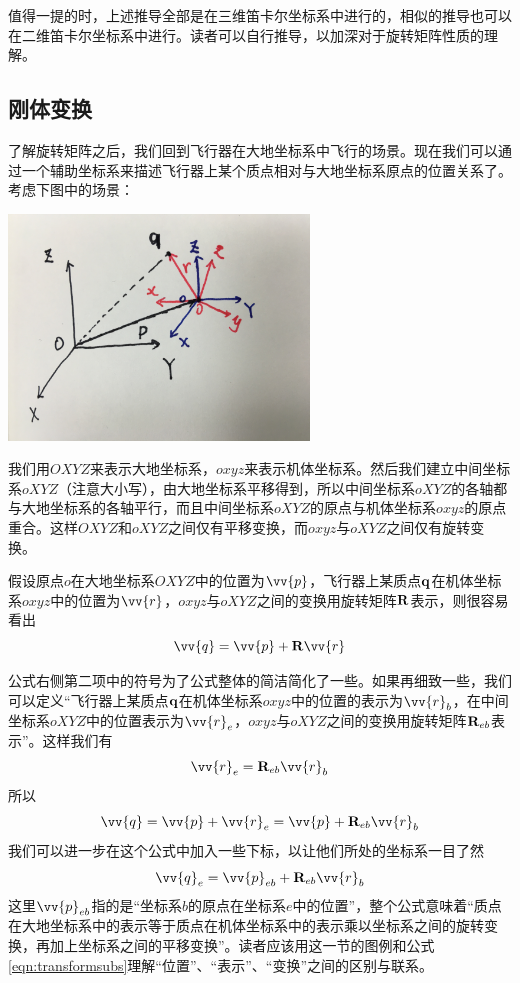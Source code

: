 \documentclass[11pt]{article}
\begin{document}
值得一提的时，上述推导全部是在三维笛卡尔坐标系中进行的，相似的推导也可以在二维笛卡尔坐标系中进行。读者可以自行推导，以加深对于旋转矩阵性质的理解。

\subsection{刚体变换}\label{sec:transform}
了解旋转矩阵之后，我们回到飞行器在大地坐标系中飞行的场景。现在我们可以通过一个辅助坐标系来描述飞行器上某个质点相对与大地坐标系原点的位置关系了。考虑下图中的场景：

\begin{center}
\includegraphics[width=0.6\textwidth]{images/IMG_2297.jpg}
\end{center}

我们用$OXYZ$来表示大地坐标系，$oxyz$来表示机体坐标系。然后我们建立中间坐标系$oXYZ$（注意大小写），由大地坐标系平移得到，所以中间坐标系$oXYZ$的各轴都与大地坐标系的各轴平行，而且中间坐标系$oXYZ$的原点与机体坐标系$oxyz$的原点重合。这样$OXYZ$和$oXYZ$之间仅有平移变换，而$oxyz$与$oXYZ$之间仅有旋转变换。



假设原点$o$在大地坐标系$OXYZ$中的位置为$\vv{p}$，飞行器上某质点$\bf{q}$在机体坐标系$oxyz$中的位置为$\vv{r}$，$oxyz$与$oXYZ$之间的变换用旋转矩阵${\bf R}$表示，则很容易看出
\begin{equation}\label{eqn:transform}
\vv{q} = \vv{p} + {\bf R}\vv{r}
\end{equation}

公式右侧第二项中的符号为了公式整体的简洁简化了一些。如果再细致一些，我们可以定义“飞行器上某质点$\bf{q}$在机体坐标系$oxyz$中的位置的表示为$\vv{r}_b$，在中间坐标系$oXYZ$中的位置表示为$\vv{r}_e$，$oxyz$与$oXYZ$之间的变换用旋转矩阵${\bf R}_{eb}$表示”。这样我们有
$$
\vv{r}_e = {\bf R}_{eb}\vv{r}_b
$$
所以
$$
\vv{q} = \vv{p} + \vv{r}_e = \vv{p} + {\bf R}_{eb}\vv{r}_b
$$
我们可以进一步在这个公式中加入一些下标，以让他们所处的坐标系一目了然
\begin{equation}\label{eqn:transformsubs}
\vv{q}_{e} = \vv{p}_{eb} + {\bf R}_{eb}\vv{r}_b
\end{equation}
这里$\vv{p}_{eb}$指的是“坐标系$b$的原点在坐标系$e$中的位置”，整个公式意味着“质点在大地坐标系中的表示等于质点在机体坐标系中的表示乘以坐标系之间的旋转变换，再加上坐标系之间的平移变换”。读者应该用这一节的图例和公式\ref{eqn:transformsubs}理解“位置”、“表示”、“变换”之间的区别与联系。
\end{document}

